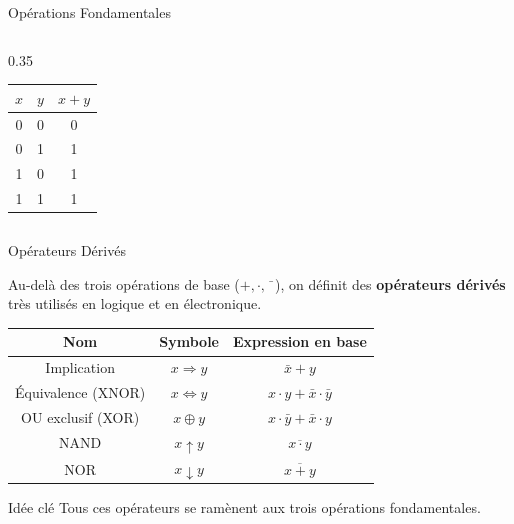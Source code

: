 \begin{frame}{Opérations Fondamentales}
\begin{columns}[T]
\begin{column}{0.35\textwidth}
            \begin{tabular}{|c|c|c|}
                \hline
                \(x\) & \(y\) & \(x + y\) \\
                \hline
                0 & 0 & 0 \\
                0 & 1 & 1 \\
                1 & 0 & 1 \\
                1 & 1 & 1 \\
                \hline
            \end{tabular}
        \end{column}
    \end{columns}

\end{frame}

\begin{frame}{Opérateurs Dérivés}

    Au-delà des trois opérations de base (\(+, \cdot, \bar{\phantom{x}}\)), on définit des \textbf{opérateurs dérivés} très utilisés en logique et en électronique.

    \vspace{0.4cm}

    \centering
    \begin{tabular}{|c|c|c|}
        \hline
        \textbf{Nom} & \textbf{Symbole} & \textbf{Expression en base} \\
        \hline
        Implication & \(x \Rightarrow y\) & \(\bar{x} + y\) \\
        Équivalence (XNOR) & \(x \Leftrightarrow y\) & \(x \cdot y + \bar{x} \cdot \bar{y}\) \\
        OU exclusif (XOR) & \(x \oplus y\) & \(x \cdot \bar{y} + \bar{x} \cdot y\) \\
        NAND & \(x \uparrow y\) & \(\overline{x \cdot y}\) \\
        NOR & \(x \downarrow y\) & \(\overline{x + y}\) \\
        \hline
    \end{tabular}

    \vspace{0.5cm}

    \begin{block}{Idée clé}
        Tous ces opérateurs se ramènent aux trois opérations fondamentales.
    \end{block}

\end{frame}
